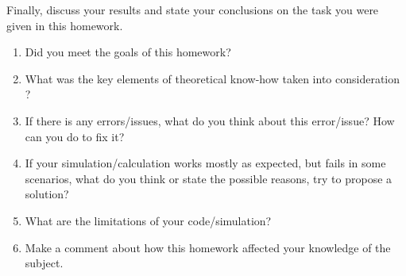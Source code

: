     Finally, discuss your results and state your conclusions on the task you were given in this
homework.
\begin{enumerate}
\item Did you meet the goals of this homework?
\item What was the key elements of theoretical know-how taken into consideration ?
\item If there is any errors/issues, what do you think about this error/issue? How can you do to fix it?
\item If your simulation/calculation works mostly as expected, but fails in some scenarios, what do you think or state the possible reasons, try to propose a solution?
\item What are the limitations of your code/simulation?
\item Make a comment about how this homework affected your knowledge of the subject.
\end{enumerate}
